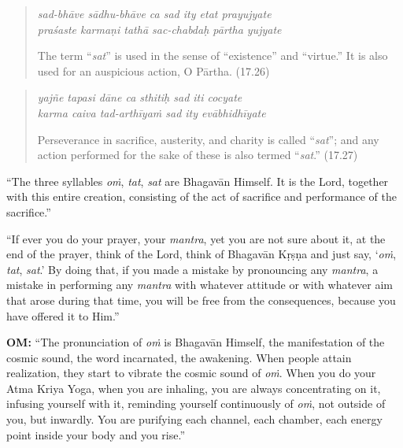 \documentclass[12pt, twoside, openright]{memoir}
\begin{document}
\par
\begin{verse}
\textit{sad-bhāve sādhu-bhāve ca sad ity etat prayujyate} \\
\textit{praśaste karmaṇi tathā sac-chabdaḥ pārtha yujyate}

\noindent The term \enquote{\textit{sat}} is used in the sense of \enquote{existence} and \enquote{virtue.} It is also used for an auspicious action, O Pārtha. (17.26)
\end{verse}
\par



\par
\begin{verse}
\textit{yajñe tapasi dāne ca sthitiḥ sad iti cocyate} \\
\textit{karma caiva tad-arthīyaṁ sad ity evābhidhīyate}

\noindent Perseverance in sacrifice, austerity, and charity is called \enquote{\textit{sat}}; and any action performed for the sake of these is also termed \enquote{\textit{sat}.} (17.27)
\end{verse}
\par


\enquote{The three syllables \textit{oṁ}, \textit{tat}, \textit{sat} are Bhagavān Himself. It is the Lord, together with this entire creation, consisting of the act of sacrifice and performance of the sacrifice.}

\enquote{If ever you do your prayer, your \textit{mantra}, yet you are not sure about it, at the end of the prayer, think of the Lord, think of Bhagavān Kṛṣṇa and just say, \enquote{\textit{oṁ}, \textit{tat}, \textit{sat}.} By doing that, if you made a mistake by pronouncing any \textit{mantra}, a mistake in performing any \textit{mantra} with whatever attitude or with whatever aim that arose during that time, you will be free from the consequences, because you have offered it to Him.}


\textbf{OṀ:} \enquote{The pronunciation of \textit{oṁ} is Bhagavān Himself, the manifestation of the cosmic sound, the word incarnated, the awakening. When people attain realization, they start to vibrate the cosmic sound of \textit{oṁ}. When you do your Atma Kriya Yoga, when you are inhaling, you are always concentrating on it, infusing yourself with it, reminding yourself continuously of \textit{oṁ}, not outside of you, but inwardly. You are purifying each channel, each chamber, each energy point inside your body and you rise.}
\end{document}
